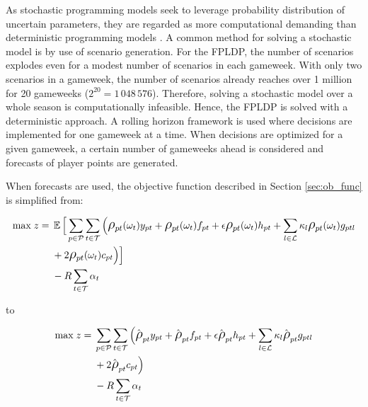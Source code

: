 As stochastic programming models seek to leverage probability distribution of uncertain parameters, they are regarded as more computational demanding than deterministic programming models \citep{Shapiro}. A common method for solving a stochastic model is by use of scenario generation. For the FPLDP, the number of scenarios explodes even for a modest number of scenarios in each gameweek. With only two scenarios in a gameweek, the number of scenarios already reaches over 1 million for 20 gameweeks ($2^{20} = 1\,048\,576$). Therefore, solving a stochastic model over a whole season is computationally infeasible. Hence, the FPLDP is solved with a deterministic approach. A rolling horizon framework is used where decisions are implemented for one gameweek at a time. When decisions are optimized for a given gameweek, a certain number of gameweeks ahead is considered and forecasts of player points are generated.

\newpar


When forecasts are used, the objective function described in Section \ref{sec:ob_func} is simplified from: 

\begin{equation*}
\smaller
\begin{aligned}
\text{max} \; z ={} & \EX \Big\lbrack\sum\limits_{p \in \mathcal{P}} \sum\limits_{t \in \mathcal{T}} \Big( \mathlarger{\rho}_{pt}(\omega_{t})y_{pt} + \mathlarger{\rho}_{pt}(\omega_{t})f_{pt} + \epsilon  \mathlarger{\rho}_{pt}(\omega_{t})h_{pt} + \sum_{l \in \mathcal{L}}\kappa_{l} \mathlarger{\rho}_{pt}(\omega_{t})g_{ptl} \\ 
&  + 2 \mathlarger{\rho}_{pt}(\omega_{t})c_{pt} \Big)  \Big\rbrack \\ 
& - R\sum_{t \in \mathcal{T}}\alpha_{t}
\end{aligned}
\end{equation*}

to 

\begin{equation*}
\smaller
\begin{aligned}
\text{max} \; z ={} &  \sum\limits_{p \in \mathcal{P}} \sum\limits_{t \in \mathcal{T}} \Big( \hat{\mathlarger{\rho}}_{pt} y_{pt} + \hat{\mathlarger{\rho}}_{pt} f_{pt} + \epsilon  \hat{\mathlarger{\rho}}_{pt} h_{pt} + \sum_{l \in \mathcal{L}}\kappa_{l} \hat{\mathlarger{\rho}}_{pt} g_{ptl} \\ 
& + 2 \hat{\mathlarger{\rho}}_{pt} c_{pt} \Big)  \\ 
& - R\sum_{t \in \mathcal{T}}\alpha_{t}
\end{aligned}
\end{equation*}


